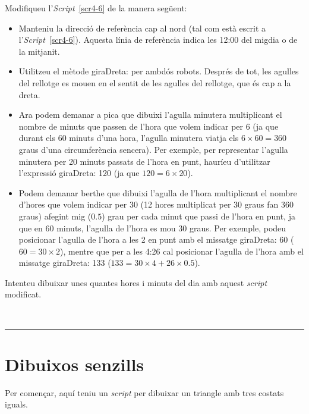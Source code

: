 \begin{center}
\colorbox{black}{}
\end{center}
{\small
\noindent
Modifiqueu l'\emph{Script}~\ref{scr4-6} de la manera següent:
\begin{itemize}
\item Manteniu la direcció de referència cap al nord (tal com està escrit a l'\emph{Script}~\ref{scr4-6}). Aquesta línia de referència indica les 12:00 del migdia o de la mitjanit.
\item Utilitzeu el mètode \textsf{giraDreta:} per ambdós robots. Després de tot, les agulles del rellotge es mouen en el sentit de les agulles del rellotge, que és cap a la dreta.
\item Ara podem demanar a \textsf{pica} que dibuixi l'agulla minutera multiplicant el nombre de minuts que passen de l'hora que volem indicar per 6 (ja que durant els 60 minuts d'una hora, l'agulla minutera viatja els $6 \times 60 = 360$ graus d'una circumferència sencera). Per exemple, per representar l'agulla minutera per 20 minuts passats de l'hora en punt, hauríeu d'utilitzar l'expressió \textsf{giraDreta: 120} (ja que $120 = 6 \times 20$).
\item Podem demanar \textsf{berthe} que dibuixi l'agulla de l'hora multiplicant el nombre d'hores que volem indicar per 30 (12 hores multiplicat per 30 graus fan 360 graus) afegint mig ($0.5$) grau per cada minut que passi de l'hora en punt, ja que en 60 minuts, l'agulla de l'hora es mou 30 graus. Per exemple, podeu posicionar l'agulla de l'hora a les 2 en punt amb el missatge \textsf{giraDreta: 60} ($60 = 30 \times 2$), mentre que per a les 4:26 cal posicionar l'agulla de l'hora amb el missatge  \textsf{giraDreta: 133} ($133 = 30 \times 4 + 26 \times 0.5$).
\end{itemize}

\noindent
Intenteu dibuixar unes quantes hores i minuts del dia amb aquest \emph{script} modificat.}\\
\noindent
\rule{\textwidth}{3pt}

\section{Dibuixos senzills}
Per començar, aquí teniu un \emph{script} per dibuixar un triangle amb tres costats iguals.  

